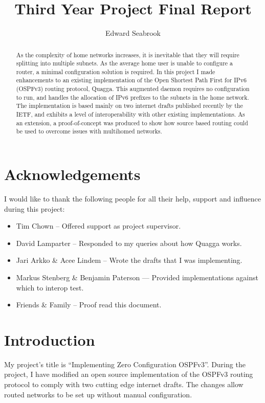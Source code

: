 \documentclass[12pt,a4paper,twoside]{report}
\author{Edward Seabrook}
\title{Third Year Project Final Report}
\begin{document}


\begin{abstract}
As the complexity of home networks increases, it is inevitable that they will
require splitting into multiple subnets. As the average home user is unable to
configure a router, a minimal configuration solution is required. In this
project I made enhancements to an existing implementation of the Open Shortest
Path First for IPv6 (OSPFv3) routing protocol, Quagga. This augmented daemon
requires no configuration to run, and handles the allocation of IPv6 prefixes
to the subnets in the home network. The implementation is based mainly on two
internet drafts published recently by the IETF\@{}, and exhibits a level of interoperability with other
existing implementations. As an extension, a proof-of-concept was produced to
show how source based routing could be used to overcome issues with multihomed
networks. 
\end{abstract}

\tableofcontents
\clearpage

\chapter*{Acknowledgements}
I would like to thank the following people for all their help, support and
influence during this project:
\begin{itemize}
\item Tim Chown -- Offered support as project supervisor.
\item David Lamparter -- Responded to my queries about how Quagga works.
\item Jari Arkko \& Acee Lindem -- Wrote the drafts that I was implementing.
\item Markus Stenberg \& Benjamin Paterson --- Provided implementations against which
      to interop test.
\item Friends \& Family -- Proof read this document.
\end{itemize}

\chapter{Introduction}
My project's title is ``Implementing Zero Configuration OSPFv3''. During the
project, I have modified an open source implementation of the OSPFv3 routing
protocol to comply with two cutting edge internet drafts. The changes allow
routed networks to be set up without manual configuration.
\end{document}
